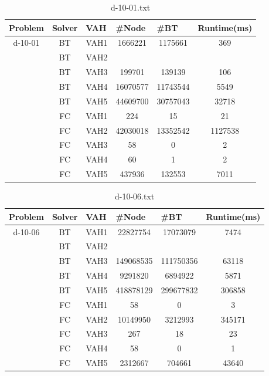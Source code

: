 \documentclass{article}
\begin{document}
\newpage
\begin{table}[]
\caption{d-10-01.txt}
\begin{tabular}{|c|c|c|c|c|c|}
\hline
Problem                   & Solver & \multicolumn{1}{l|}{VAH} & \multicolumn{1}{l|}{\#Node} & \multicolumn{1}{l|}{\#BT} & \multicolumn{1}{l|}{Runtime(ms)} \\ \hline
\multirow{10}{*}{d-10-01} & BT     & VAH1                     & 1666221                     & 1175661                   & 369                              \\ \cline{2-6} 
 & BT & VAH2 &          &           &       \\ \cline{2-6} 
 & BT & VAH3 & 199701   & 139139    & 106   \\ \cline{2-6} 
 & BT & VAH4 & 16070577 & 11743544  & 5549  \\ \cline{2-6} 
 & BT & VAH5 & 44609700 & 30757043  & 32718 \\ \cline{2-6} 
 & FC & VAH1 & 224      & 15        & 21    \\ \cline{2-6} 
 & FC & VAH2 & 42030018 & 13352542  & 1127538  \\ \cline{2-6} 
 & FC & VAH3 & 58       & 0         & 2     \\ \cline{2-6} 
 & FC & VAH4 & 60       & 1         & 2     \\ \cline{2-6} 
 & FC & VAH5 & 437936   & 132553         & 7011      \\ \hline
\end{tabular}
\end{table}

\begin{table}[]
\caption{d-10-06.txt}
\begin{tabular}{|c|c|c|c|c|c|}
\hline
Problem                   & Solver & \multicolumn{1}{l|}{VAH} & \multicolumn{1}{l|}{\#Node} & \multicolumn{1}{l|}{\#BT} & \multicolumn{1}{l|}{Runtime(ms)} \\ \hline
\multirow{10}{*}{d-10-06} & BT     & VAH1                     & 22827754                    & 17073079                  & 7474                             \\ \cline{2-6} 
 & BT & VAH2 &           &           &        \\ \cline{2-6} 
 & BT & VAH3 & 149068535 & 111750356 & 63118  \\ \cline{2-6} 
 & BT & VAH4 & 9291820   & 6894922   & 5871   \\ \cline{2-6} 
 & BT & VAH5 & 418878129 & 299677832 & 306858 \\ \cline{2-6} 
 & FC & VAH1 & 58        & 0         & 3      \\ \cline{2-6} 
 & FC & VAH2 & 10149950  & 3212993   & 345171  \\ \cline{2-6} 
 & FC & VAH3 & 267       & 18        & 23     \\ \cline{2-6} 
 & FC & VAH4 & 58        & 0         & 1      \\ \cline{2-6} 
 & FC & VAH5 & 2312667   & 704661    & 43640  \\ \hline
\end{tabular}
\end{table}
\end{document}
